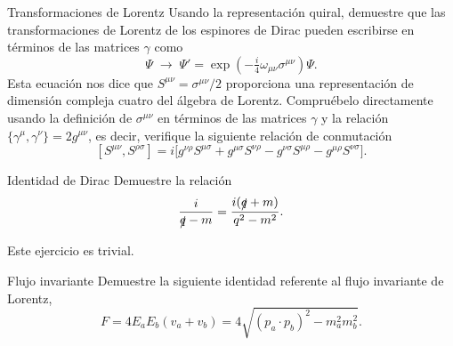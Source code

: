 
\begin{Ejercicio}{Transformaciones de Lorentz}
	Usando la representación quiral, demuestre que las transformaciones de Lorentz de los espinores de Dirac pueden escribirse en términos de las matrices $\gamma$ como
	\[
		\Psi \;\longrightarrow\; \Psi' = \exp\!\left(-\tfrac{i}{4}\omega_{\mu\nu}\sigma^{\mu\nu}\right)\Psi.
	\]
	Esta ecuación nos dice que $S^{\mu\nu} = \sigma^{\mu\nu}/2$ proporciona una representación de dimensión compleja cuatro del álgebra de Lorentz.
	Compruébelo directamente usando la definición de $\sigma^{\mu\nu}$ en términos de las matrices $\gamma$ y la relación $\{\gamma^\mu,\gamma^\nu\}=2g^{\mu\nu}$, es decir, verifique la siguiente relación de conmutación
	\[
		[S^{\mu\nu},S^{\rho\sigma}] = i\Big[g^{\nu\rho}S^{\mu\sigma} + g^{\mu\sigma}S^{\nu\rho} - g^{\nu\sigma}S^{\mu\rho} - g^{\mu\rho}S^{\nu\sigma}\Big].
	\]
\end{Ejercicio}





\begin{Ejercicio}{Identidad de Dirac}
	Demuestre la relación
	\[
		\frac{i}{\slashed{q}-m} = \frac{i(\slashed{q}+m)}{q^2-m^2}.
	\]
\end{Ejercicio}
Este ejercicio es trivial.



\begin{Ejercicio}{Flujo invariante}
	Demuestre la siguiente identidad referente al flujo invariante de Lorentz,
	\[
		F = 4E_aE_b(v_a+v_b) = 4\sqrt{(p_a\cdot p_b)^2 - m_a^2 m_b^2}.
	\]
\end{Ejercicio}



